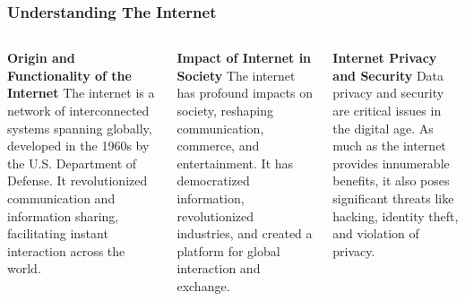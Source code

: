 \documentclass[5pt]{beamer}
\begin{document}
\begin{frame}
\frametitle{Understanding The Internet}
\begin{columns}
\begin{column}{0.3\textwidth}
\begin{block}{\textbf{Origin and Functionality of the Internet}}
The internet is a network of interconnected systems spanning globally, developed in the 1960s by the U.S. Department of Defense. It revolutionized communication and information sharing, facilitating instant interaction across the world.
\end{block}
\end{column}
\begin{column}{0.3\textwidth}
\begin{block}{\textbf{Impact of Internet in Society}}
The internet has profound impacts on society, reshaping communication, commerce, and entertainment. It has democratized information, revolutionized industries, and created a platform for global interaction and exchange.
\end{block}
\end{column}
\begin{column}{0.3\textwidth}
\begin{block}{\textbf{Internet Privacy and Security}}
Data privacy and security are critical issues in the digital age. As much as the internet provides innumerable benefits, it also poses significant threats like hacking, identity theft, and violation of privacy.
\end{block}
\end{column}
\end{columns}
\end{frame}
\end{document}
